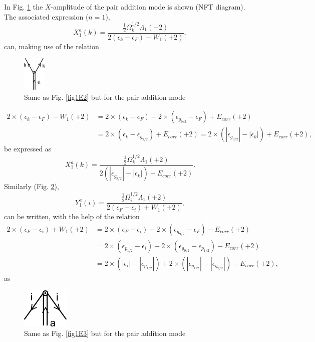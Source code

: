 In Fig. \ref{fig1E4} the $X$-amplitude of the pair addition mode is shown (NFT diagram). The associated expression ($n=1$),
\begin{equation*}
X_1^a(k)=\frac{\frac{1}{2}\Omega_k^{1/2}\Lambda_1(+2)}{2(\epsilon_k-\epsilon_F)-W_1(+2)},
\end{equation*}
can, making use of the relation
  \begin{figure}
  \centerline{\includegraphics*[width=0.1\textwidth,angle=0]{nutshell/figs/addition_forward.pdf}}
  \caption[Pair addition mode.]{ Same as Fig. \ref{fig1E2} but for the pair addition mode}\label{fig1E4}
  \end{figure}
  
\begin{equation*}
\begin{split}
2\times(\epsilon_k-\epsilon_F)-W_1(+2)&=2\times(\epsilon_k-\epsilon_F)-2\times(\epsilon_{g_{9/2}}-\epsilon_F)+E_{corr}(+2)\\
&=2\times(\epsilon_k-\epsilon_{g_{9/2}})+E_{corr}(+2)=2\times(|\epsilon_{g_{9/2}}|-|\epsilon_k|)+E_{corr}(+2),
\end{split}
\end{equation*}
be expressed as
\begin{equation*}
X_1^a(k)=\frac{\frac{1}{2}\Omega_k^{1/2}\Lambda_1(+2)}{2(|\epsilon_{g_{9/2}}|-|\epsilon_k|)+E_{corr}(+2)}.
\end{equation*}
Similarly (Fig. \ref{fig1E5}),
\begin{equation*}
Y_1^a(i)=\frac{\frac{1}{2}\Omega_i^{1/2}\Lambda_1(+2)}{2(\epsilon_F-\epsilon_i)+W_1(+2)},
\end{equation*}
can be written, with the help of the relation
\begin{equation*}
\begin{split}
2\times(\epsilon_F-\epsilon_i)+W_1(+2)&=2\times(\epsilon_F-\epsilon_i)-2\times(\epsilon_{g_{9/2}}-\epsilon_F)-E_{corr}(+2)\\
&=2\times(\epsilon_{p_{1/2}}-\epsilon_i)+2\times(\epsilon_{g_{9/2}}-\epsilon_{p_{1/2}})-E_{corr}(+2)\\
&=2\times(|\epsilon_i|-|\epsilon_{p_{1/2}}|)+2\times(|\epsilon_{p_{1/2}}|-|\epsilon_{g_{9/2}}|)-E_{corr}(+2),
\end{split}
\end{equation*}
as
  \begin{figure}
  \centerline{\includegraphics*[width=0.2\textwidth,angle=0]{nutshell/figs/addition_backward.pdf}}
  \caption{ Same as Fig. \ref{fig1E3} but for the pair addition mode}\label{fig1E5}
  \end{figure}

